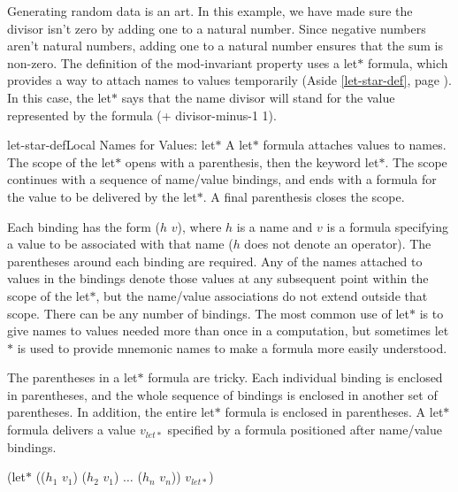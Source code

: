 Generating
random data
is an art.
In this example, we have made sure the divisor isn't zero
by adding one to a natural number.
Since negative numbers aren't natural numbers, adding one
to a natural number ensures that the sum is non-zero.
\label{let-example-brief-explain}
The definition of the \textsf{mod-invariant} property
uses a \textsf{let$*$} formula,
which provides a way to attach names to values temporarily
(Aside \ref{let-star-def}, page \pageref{let-star-def}).
In this case, the \textsf{let$*$} says that
the name \textsf{divisor} will stand for
the value represented by the formula \textsf{(+ divisor-minus-1 1)}.

\begin{aside}{let-star-def}{Local Names for Values: \textsf{let$*$}}
A
\textsf{let$*$}
formula attaches values to names.
The scope of the \textsf{let$*$} opens with a parenthesis,
then the keyword \textsf{let$*$}.
The scope continues with
a sequence of name/value bindings,
and ends with a formula for the value
to be delivered by the \textsf{let$*$}.
A final parenthesis closes the scope.

Each binding has the form ($h$ $v$),
where $h$ is a name and $v$ is a
formula specifying a value to be associated with that name
($h$ does not denote an operator).
The parentheses around each binding are required.
Any of the names attached to values in the bindings
denote those values at any
subsequent point within the scope
of the \textsf{let$*$},
but the name/value associations do not
extend outside that scope.
There can be any number of bindings.
The most common use of \textsf{let$*$} is to give names
to values needed more than once in a computation,
but sometimes \textsf{let$*$} is used to provide mnemonic names
to make a formula more easily understood.

The parentheses in a \textsf{let$*$} formula are tricky.
Each individual binding is enclosed in parentheses,
and the whole sequence of bindings is enclosed in another set
of parentheses. In addition, the entire \textsf{let$*$} formula
is enclosed in parentheses.
A \textsf{let$*$} formula delivers a value $v_{let*}$
specified by a formula positioned after name/value bindings.
\begin{center}
(let$*$ (($h_1$ $v_1$) ($h_2$ $v_1$) $\dots$ ($h_n$ $v_n$)) $v_{let*}$)
\end{center}
\end{aside}

